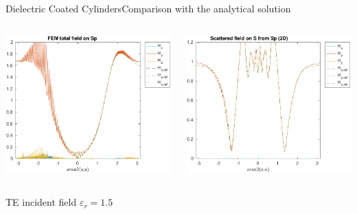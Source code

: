 \begin{frame}[allowframebreaks]{Dielectric Coated Cylinders}{Comparison with the analytical solution }
\begin{columns}
      \includegraphics[width=\linewidth]{results/TE/H_Sp.pdf}

      \includegraphics[width=\linewidth]{results/TE/H_S.pdf}
      
    \end{columns}

    \framebreak

    \hfill TE incident field $\varepsilon_r=1.5$ \hfill\mbox{}
    

\end{frame}
